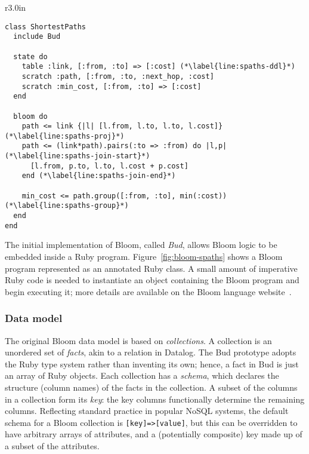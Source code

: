 \begin{wrapfigure}[=18]{r}{3.0in}
\begin{scriptsize}
\begin{lstlisting}
class ShortestPaths
  include Bud

  state do
    table :link, [:from, :to] => [:cost] (*\label{line:spaths-ddl}*)
    scratch :path, [:from, :to, :next_hop, :cost]
    scratch :min_cost, [:from, :to] => [:cost]
  end

  bloom do
    path <= link {|l| [l.from, l.to, l.to, l.cost]} (*\label{line:spaths-proj}*)
    path <= (link*path).pairs(:to => :from) do |l,p| (*\label{line:spaths-join-start}*)
      [l.from, p.to, l.to, l.cost + p.cost]
    end (*\label{line:spaths-join-end}*)

    min_cost <= path.group([:from, :to], min(:cost)) (*\label{line:spaths-group}*)
  end
end
\end{lstlisting}
\end{scriptsize}
\caption{All-pairs shortest paths of a directed graph in Bloom.}
\label{fig:bloom-spaths}
\end{wrapfigure}
The initial implementation of Bloom, called \emph{Bud}, allows Bloom logic to be
embedded inside a Ruby program. Figure~\ref{fig:bloom-spaths} shows a Bloom
program represented as an annotated Ruby class. A small amount of imperative
Ruby code is needed to instantiate an object containing the Bloom program and begin executing it;
more details are available on the Bloom language website~\cite{bloom-website}.

\subsubsection{Data model}

The original Bloom data model is based on \emph{collections}.  A collection is an
unordered set of \emph{facts}, akin to a relation in Datalog. The Bud prototype
adopts the Ruby type system rather than inventing its own; hence, a fact in Bud
is just an array of Ruby objects. Each collection has a \emph{schema}, which
declares the structure (column names) of the facts in the collection. A subset
of the columns in a collection form its \emph{key}: 
the key columns functionally determine the remaining columns. 
Reflecting standard practice in popular NoSQL systems, the default schema for a Bloom collection is \texttt{[key]=>[value]}, but this can be overridden to have arbitrary arrays of attributes, and a (potentially composite) key made up of a subset of the attributes.

